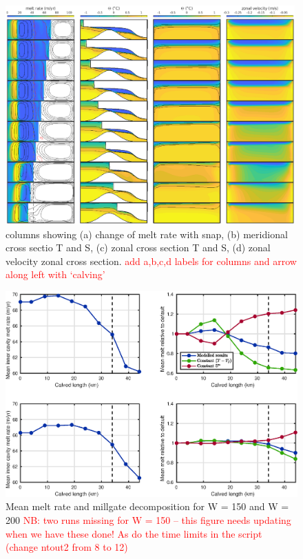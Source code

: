 \documentclass[draft]{agujournal2019}
\newcommand{\red}[1]{\textcolor{red}{#1}}
\begin{document}
\begin{figure}
    \centering
    \includegraphics[width = 0.99\textwidth]{../make_figures/plots/figure5.eps}
    \caption{columns showing (a) change of melt rate with snap, (b) meridional cross sectio T and S, (c) zonal cross section T and S, (d) zonal velocity zonal cross section. \red{add a,b,c,d labels for columns and arrow along left with `calving'}}
    \label{fig:fig5}
\end{figure}

\begin{figure}
    \centering
    \includegraphics{../make_figures/plots/figure6.eps}
    \caption{Mean melt rate and millgate decomposition for W = 150 and W = 200 \red{NB: two runs missing for W = 150 -- this figure needs updating when we have these done! As do the time limits in the script (change ntout2 from 8 to 12)}}
    \label{fig:figure6}
\end{figure}
\end{document}
